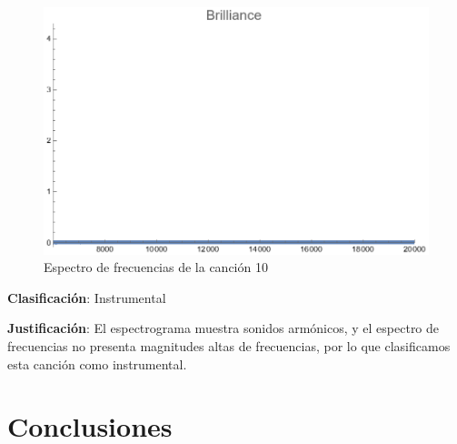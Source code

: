 \documentclass[12pt, letterpaper]{article}
\begin{document}
\begin{figure}[H]
\begin{minipage}{.3\textwidth}
  \end{minipage}
  \begin{minipage}{0.03\textwidth}\end{minipage}
  \begin{minipage}{.3\textwidth}
    \centering
    \includegraphics[width=.9\linewidth]{imgs/Cancion10/brilliance.png}
  \end{minipage}
  \caption{Espectro de frecuencias de la canción 10}
  \label{fig:esp010}
\end{figure}

\textbf{Clasificación}: Instrumental

\textbf{Justificación}: El espectrograma muestra sonidos armónicos, y el
espectro de frecuencias no presenta magnitudes altas de frecuencias, por lo que
clasificamos esta canción como instrumental.

\newpage

\section{Conclusiones}
\end{document}
